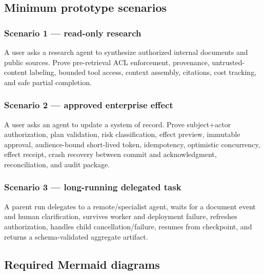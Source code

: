 \subsection{Minimum prototype scenarios}

\subsubsection{Scenario 1 — read-only research}

A user asks a research agent to synthesize authorized internal documents and public sources. Prove pre-retrieval ACL enforcement, provenance, untrusted-content labeling, bounded tool access, context assembly, citations, cost tracking, and safe partial completion.\par

\subsubsection{Scenario 2 — approved enterprise effect}

A user asks an agent to update a system of record. Prove subject+actor authorization, plan validation, risk classification, effect preview, immutable approval, audience-bound short-lived token, idempotency, optimistic concurrency, effect receipt, crash recovery between commit and acknowledgment, reconciliation, and audit package.\par

\subsubsection{Scenario 3 — long-running delegated task}

A parent run delegates to a remote/specialist agent, waits for a document event and human clarification, survives worker and deployment failure, refreshes authorization, handles child cancellation/failure, resumes from checkpoint, and returns a schema-validated aggregate artifact.\par

\subsection{Required Mermaid diagrams}

